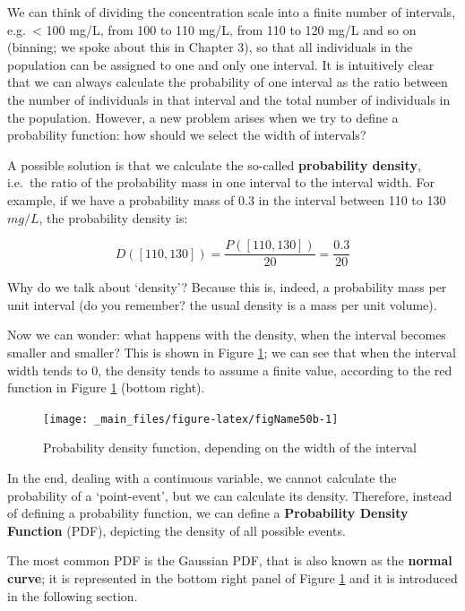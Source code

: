 \documentclass[a4paper,12pt,oneside]{book}
\begin{document}
We can think of dividing the concentration scale into a finite number of intervals, e.g.~\textless{} 100 mg/L, from 100 to 110 mg/L, from 110 to 120 mg/L and so on (binning; we spoke about this in Chapter 3), so that all individuals in the population can be assigned to one and only one interval. It is intuitively clear that we can always calculate the probability of one interval as the ratio between the number of individuals in that interval and the total number of individuals in the population. However, a new problem arises when we try to define a probability function: how should we select the width of intervals?

A possible solution is that we calculate the so-called \textbf{probability density}, i.e.~the ratio of the probability mass in one interval to the interval width. For example, if we have a probability mass of 0.3 in the interval between 110 to 130 \(mg/L\), the probability density is:

\[D([110, 130]) = \frac{P([110,130])}{20} = \frac{0.3}{20}\]

Why do we talk about `density'? Because this is, indeed, a probability mass per unit interval (do you remember? the usual density is a mass per unit volume).

Now we can wonder: what happens with the density, when the interval becomes smaller and smaller? This is shown in Figure \ref{fig:figName50b}; we can see that when the interval width tends to 0, the density tends to assume a finite value, according to the red function in Figure \ref{fig:figName50b} (bottom right).

\begin{figure}

{\centering \texttt{[image: \_main\_files/figure-latex/figName50b-1]} 

}

\caption{Probability density function, depending on the width of the interval}\label{fig:figName50b}
\end{figure}

In the end, dealing with a continuous variable, we cannot calculate the probability of a `point-event', but we can calculate its density. Therefore, instead of defining a probability function, we can define a \textbf{Probability Density Function} (PDF), depicting the density of all possible events.

The most common PDF is the Gaussian PDF, that is also known as the \textbf{normal curve}; it is represented in the bottom right panel of Figure \ref{fig:figName50b} and it is introduced in the following section.
\end{document}

